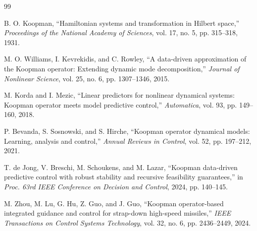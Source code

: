 \documentclass[letterpaper,journal]{IEEEtran}
\begin{document}
\balance
\begin{thebibliography}{99}

B. O. Koopman, ``Hamiltonian systems and transformation in Hilbert space,'' \emph{Proceedings of the National Academy of Sciences}, vol. 17, no. 5, pp. 315--318, 1931.

M. O. Williams, I. Kevrekidis, and C. Rowley, ``A data-driven approximation of the Koopman operator: Extending dynamic mode decomposition,'' \emph{Journal of Nonlinear Science}, vol. 25, no. 6, pp. 1307--1346, 2015.

M. Korda and I. Mezic, ``Linear predictors for nonlinear dynamical systems: Koopman operator meets model predictive control,'' \emph{Automatica}, vol. 93, pp. 149--160, 2018.

P. Bevanda, S. Sosnowski, and S. Hirche, ``Koopman operator dynamical models: Learning, analysis and control,'' \emph{Annual Reviews in Control}, vol. 52, pp. 197--212, 2021.

T. de Jong, V. Breschi, M. Schoukens, and M. Lazar, ``Koopman data-driven predictive control with robust stability and recursive feasibility guarantees,'' in \emph{Proc. 63rd IEEE Conference on Decision and Control}, 2024, pp. 140--145.

M. Zhou, M. Lu, G. Hu, Z. Guo, and J. Guo, ``Koopman operator-based integrated guidance and control for strap-down high-speed missiles,'' \emph{IEEE Transactions on Control Systems Technology}, vol. 32, no. 6, pp. 2436--2449, 2024.

\end{thebibliography}
\end{document}
